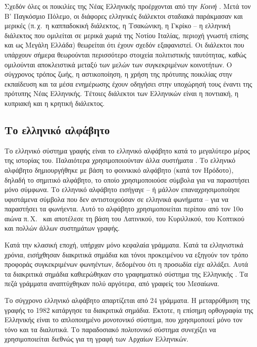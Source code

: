 \documentclass[]{../../metanetpaper}
\begin{document}
\begin{multicols}{2}
Σχεδόν όλες οι ποικιλίες της Νέας Ελληνικής προέρχονται από την \textit{Κοινή} \cite{Bro1}. Μετά τον Β' Παγκόσμιο Πόλεμο, οι διάφορες ελληνικές διάλεκτοι σταδιακά παράκμασαν και μερικές (π.\,χ.~η καππαδοκική διάλεκτος, η Τσακώνικη, η Γκρίκο – η ελληνική διάλεκτος που ομιλείται σε μερικά χωριά της Νοτίου Ιταλίας, περιοχή γνωστή επίσης και ως Μεγάλη Ελλάδα) θεωρείται ότι έχουν σχεδόν εξαφανιστεί. Οι διάλεκτοι που υπάρχουν σήμερα θεωρούνται περισσότερο στοιχεία πολιτιστικής ταυτότητας, καθώς ομιλούνται αποκλειστικά μεταξύ των μελών  των συγκεκριμένων κοινοτήτων. Ο σύγχρονος τρόπος ζωής, η αστικοποίηση, η χρήση της πρότυπης ποικιλίας στην εκπαίδευση και τα μέσα ενημέρωσης έχουν οδηγήσει στην υποχώρησή τους έναντι της πρότυπης Νέας Ελληνικής. Τέτοιες διάλεκτοι των Ελληνικών είναι η ποντιακή, η κυπριακή και η κρητική διάλεκτος. 

\subsection{Το ελληνικό αλφάβητο}

Το ελληνικό σύστημα γραφής είναι το ελληνικό αλφάβητο κατά το μεγαλύτερο μέρος της ιστορίας του. Παλαιότερα χρησιμοποιούνταν άλλα συστήματα \cite{Kopi1}. Το ελληνικό αλφάβητο δημιουργήθηκε με βάση το φοινικικό αλφάβητο (κατά τον Ηρόδοτο), δηλαδή το σημιτικό αλφάβητο, το οποίο χρησιμοποιούσε σύμβολα για να παραστήσει μόνο σύμφωνα. Το ελληνικό αλφάβητο εισήγαγε – ή μάλλον επαναχρησιμοποίησε υφιστάμενα σύμβολα που δεν αντιστοιχούσαν σε ελληνικά φωνήματα – για να παραστήσει τα φωνήεντα. Αυτό το αλφάβητο χρησιμοποιείται περίπου από τον 10ο αιώνα π.\,Χ.~\cite{Tonn1} και αποτέλεσε τη βάση του Λατινικού, του Κυριλλικού, του Κοπτικού και πολλών άλλων συστημάτων γραφής.

Κατά την κλασική εποχή, υπήρχαν μόνο κεφαλαία γράμματα. Κατά τα ελληνιστικά χρόνια, εισήχθησαν διακριτικά σημάδια και τόνοι προκειμένου να εξηγούν τον τρόπο προφοράς συγκεκριμένων φωνηέντων, δεδομένου ότι η προσωδία είχε αλλάξει. Αυτά τα διακριτικά σημάδια καθιερώθηκαν στο γραφηματικό  σύστημα της Ελληνικής \cite{Chris1}. Τα πεζά γράμματα αναπτύχθηκαν πολύ αργότερα, από γραφείς του Μεσαίωνα.

Το σύγχρονο ελληνικό αλφάβητο απαρτίζεται από 24 γράμματα. Η μεταρρύθμιση της γραφής το 1982 κατάργησε τα διακριτικά σημάδια. Έκτοτε, η επίσημη ορθογραφία της Ελληνικής είναι το απλοποιημένο \textit{μονοτονικό} σύστημα, που χρησιμοποιεί μόνο τον τόνο και τα διαλυτικά. Το παραδοσιακό \textit{πολυτονικό} σύστημα συνεχίζει να χρησιμοποιείται διεθνώς για τη γραφή των Αρχαίων Ελληνικών.


\end{multicols}
\end{document}
